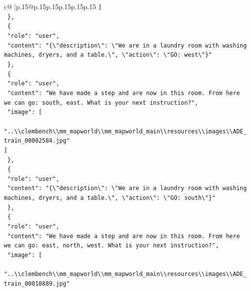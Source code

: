 \documentclass{article}
\begin{document}
{\begin{supertabular}{c@{$\;$}|p{.15\linewidth}@{}p{.15\linewidth}p{.15\linewidth}p{.15\linewidth}p{.15\linewidth}p{.15\linewidth}}
{{{\texttt{    {]}} \\
\texttt{  \},} \\
\texttt{  \{} \\
\texttt{    "role": "user",} \\
\texttt{    "content": "\{\textbackslash{}"description\textbackslash{}": \textbackslash{}"We are in a laundry room with washing machines, dryers, and a table.\textbackslash{}", \textbackslash{}"action\textbackslash{}": \textbackslash{}"GO: west\textbackslash{}"\}"} \\
\texttt{  \},} \\
\texttt{  \{} \\
\texttt{    "role": "user",} \\
\texttt{    "content": "We have made a step and are now in this room. From here we can go: south, east. What is your next instruction?",} \\
\texttt{    "image": {[}} \\
\texttt{      "..\textbackslash{}\textbackslash{}clembench\textbackslash{}\textbackslash{}mm\_mapworld\textbackslash{}\textbackslash{}mm\_mapworld\_main\textbackslash{}\textbackslash{}resources\textbackslash{}\textbackslash{}images\textbackslash{}\textbackslash{}ADE\_train\_00002584.jpg"} \\
\texttt{    {]}} \\
\texttt{  \},} \\
\texttt{  \{} \\
\texttt{    "role": "user",} \\
\texttt{    "content": "\{\textbackslash{}"description\textbackslash{}": \textbackslash{}"We are in a laundry room with washing machines, dryers, and a table.\textbackslash{}", \textbackslash{}"action\textbackslash{}": \textbackslash{}"GO: south\textbackslash{}"\}"} \\
\texttt{  \},} \\
\texttt{  \{} \\
\texttt{    "role": "user",} \\
\texttt{    "content": "We have made a step and are now in this room. From here we can go: east, north, west. What is your next instruction?",} \\
\texttt{    "image": {[}} \\
\texttt{      "..\textbackslash{}\textbackslash{}clembench\textbackslash{}\textbackslash{}mm\_mapworld\textbackslash{}\textbackslash{}mm\_mapworld\_main\textbackslash{}\textbackslash{}resources\textbackslash{}\textbackslash{}images\textbackslash{}\textbackslash{}ADE\_train\_00010889.jpg"} \\
}}}
\end{supertabular}}
\end{document}
